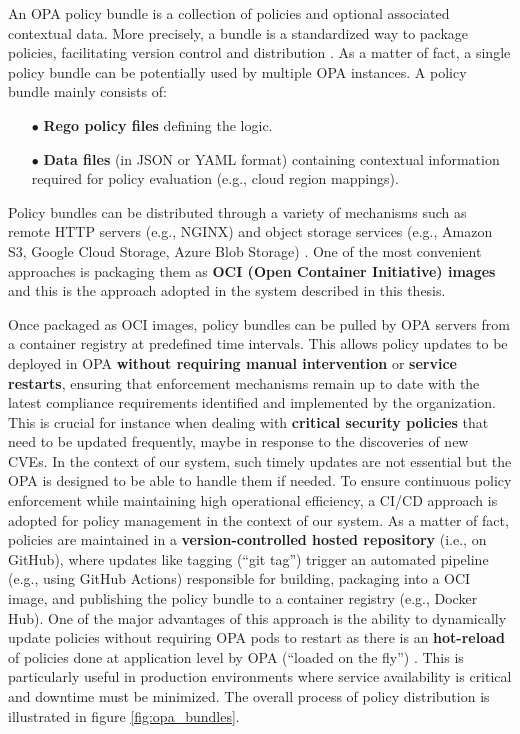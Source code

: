 An OPA policy bundle is a collection of policies and optional associated contextual data. More precisely, a bundle is a standardized way to package policies, facilitating version control and distribution \cite{opa_bundles}. As a matter of fact, a single policy bundle can be potentially used by multiple OPA instances.
A policy bundle mainly consists of:
\begin{itemize}[itemsep=0.2pt, topsep=1pt]
  \item[$\bullet$] \textbf{Rego policy files} defining the logic.
  \item[$\bullet$] \textbf{Data files} (in JSON or YAML format) containing contextual information required for policy evaluation (e.g., cloud region mappings).
\end{itemize} 

Policy bundles can be distributed through a variety of mechanisms such as remote HTTP servers (e.g., NGINX) and object storage services (e.g., Amazon S3, Google Cloud Storage, Azure Blob Storage) \cite{opa_bundles}.
One of the most convenient approaches is packaging them as \textbf{OCI (Open Container Initiative) images} \cite{oci} and this is the approach adopted in the system described in this thesis.

Once packaged as OCI images, policy bundles can be pulled by OPA servers from a container registry at predefined time intervals. This allows policy updates to be deployed in OPA \textbf{without requiring manual intervention} or \textbf{service restarts}, ensuring that enforcement mechanisms remain up to date with the latest compliance requirements identified and implemented by the organization. This is crucial for instance when dealing with \textbf{critical security policies} that need to be updated frequently, maybe in response to the discoveries of new CVEs. In the context of our system, such timely updates are not essential but the OPA is designed to be able to handle them if needed.
To ensure continuous policy enforcement while maintaining high operational efficiency, a CI/CD approach is adopted for policy management in the context of our system.
As a matter of fact, policies are maintained in a \textbf{version-controlled hosted repository} (i.e., on GitHub), where updates like tagging (``git tag'') trigger an automated pipeline (e.g., using GitHub Actions) responsible for building, packaging into a OCI image, and publishing the policy bundle to a container registry (e.g., Docker Hub).
One of the major advantages of this approach is the ability to dynamically update policies without requiring OPA pods to restart as there is an \textbf{hot-reload} of policies done at application level by OPA (``loaded on the fly'') \cite{opa_bundles}. This is particularly useful in production environments where service availability is critical and downtime must be minimized. 
The overall process of policy distribution is illustrated in figure \ref{fig:opa_bundles}.

